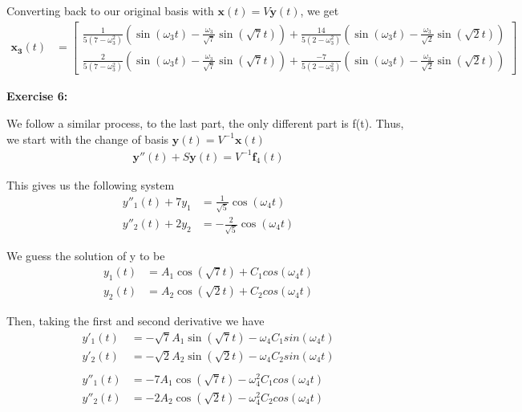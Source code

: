 \documentclass[12pt]{article}
\begin{document}
Converting back to our original basis with $\mathbf{x}(t) = V\mathbf{y}(t)$, we get
\begin{align*}
    \mathbf{x_3}(t) & = \begin{bmatrix}
                            \frac{1}{5(7-\omega_3^2)}(\sin(\omega_{3}t) - \frac{\omega_3}{\sqrt{7}}\sin(\sqrt{7}t)) + \frac{14}{5(2-\omega_3^2)}(\sin(\omega_{3}t) - \frac{\omega_3}{\sqrt{2}}\sin(\sqrt{2}t)) \\
                            \frac{2}{5(7-\omega_3^2)}(\sin(\omega_{3}t) - \frac{\omega_3}{\sqrt{7}}\sin(\sqrt{7}t)) + \frac{-7}{5(2-\omega_3^2)}(\sin(\omega_{3}t) - \frac{\omega_3}{\sqrt{2}}\sin(\sqrt{2}t))
                        \end{bmatrix}
\end{align*}

\noindent{}\textbf{Exercise 6:}

We follow a similar process, to the last part, the only different part is f(t). Thus, we start with the change of basis $\mathbf{y}(t) = V^{-1}\mathbf{x}(t)$
\begin{align*}
    \mathbf{y}''(t) + S\mathbf{y}(t) = V^{-1}\mathbf{f}_4(t)
\end{align*}

This gives us the following system
\begin{align*}
    y''_1(t) + 7y_1 & = \frac{1}{\sqrt{5}} \cos(\omega_4t)  \\
    y''_2(t) + 2y_2 & = -\frac{2}{\sqrt{5}} \cos(\omega_4t)
\end{align*}

We guess the solution of y to be
\begin{align*}
    y_1(t) & = A_1\cos(\sqrt{7}t) +  C_1cos(\omega_{4}t) \\
    y_2(t) & = A_2\cos(\sqrt{2}t) +  C_2cos(\omega_{4}t)
\end{align*}

Then, taking the first and second derivative we have
\begin{align*}
    y'_1(t)  & = -\sqrt{7}A_1\sin(\sqrt{7}t)  - \omega_{4} C_1 sin(\omega_{4}t) \\
    y'_2(t)  & = -\sqrt{2}A_2\sin(\sqrt{2}t)  - \omega_{4} C_2 sin(\omega_{4}t) \\\\
    y''_1(t) & = -7A_1\cos(\sqrt{7}t)  - \omega_{4}^2 C_1cos(\omega_{4}t)       \\
    y''_2(t) & = -2A_2\cos(\sqrt{2}t)  - \omega_{4}^2 C_2cos(\omega_{4}t)
\end{align*}
\end{document}
